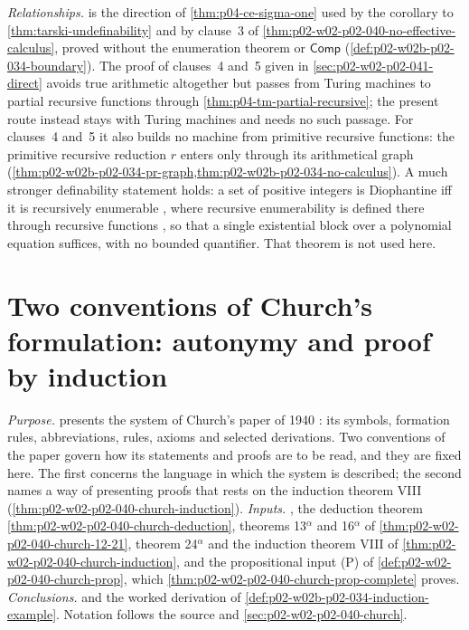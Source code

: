 \emph{Relationships.}   is the
direction of \cref{thm:p04-ce-sigma-one} used by the
corollary to \cref{thm:tarski-undefinability} and by clause~3 of
\cref{thm:p02-w02-p02-040-no-effective-calculus}, proved without the
enumeration theorem or \(\mathsf{Comp}\)
(\cref{def:p02-w02b-p02-034-boundary}).  The proof of clauses~4
and~5 given in \cref{sec:p02-w02-p02-041-direct} avoids true arithmetic
altogether but passes from Turing machines to partial recursive functions
through \cref{thm:p04-tm-partial-recursive}; the present route instead stays
with Turing machines and needs no such passage.  For clauses~4 and~5 it also
builds no machine from primitive recursive functions: the primitive
recursive reduction \(r\) enters only through its arithmetical graph
(\cref{thm:p02-w02b-p02-034-pr-graph,thm:p02-w02b-p02-034-no-calculus}).  A much stronger
definability statement holds: a set of positive integers is Diophantine iff
it is recursively enumerable \cite[\S8, Theorem~8.1, p.~264]{Davis1973},
where recursive enumerability is defined there through recursive functions
\cite[\S8, Definition~8.1, p.~264]{Davis1973}, so that a single existential
block over a polynomial equation suffices, with no bounded quantifier.  That
theorem is not used here.

\section{Two conventions of Church's formulation: autonymy and proof by induction}
\label{sec:p02-w02b-p02-034-church-conventions}

\emph{Purpose.}   presents the system of
Church's paper of 1940 \cite{Church1940}: its symbols, formation rules,
abbreviations, rules, axioms and selected derivations.  Two conventions of
the paper govern how its statements and proofs are to be read, and they are
fixed here.  The first concerns the language in which the system is
described; the second names a way of presenting proofs that rests on the
induction theorem VIII (\cref{thm:p02-w02-p02-040-church-induction}).
\emph{Inputs.}  ,
the deduction theorem \cref{thm:p02-w02-p02-040-church-deduction}, theorems
13\(^\alpha\) and 16\(^\alpha\) of \cref{thm:p02-w02-p02-040-church-12-21},
theorem 24\(^\alpha\) and the induction theorem VIII of
\cref{thm:p02-w02-p02-040-church-induction}, and the propositional input (P)
of \cref{def:p02-w02-p02-040-church-prop}, which
\cref{thm:p02-w02-p02-040-church-prop-complete} proves.
\emph{Conclusions.}  
and the worked derivation of \cref{def:p02-w02b-p02-034-induction-example}.
Notation follows the source and \cref{sec:p02-w02-p02-040-church}.

